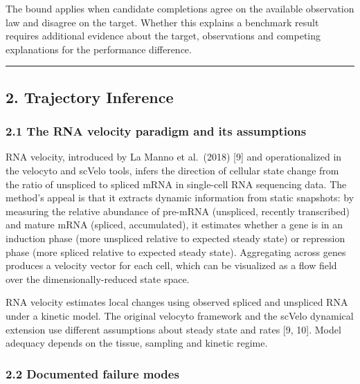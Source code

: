 \documentclass[
]{article}
\begin{document}
The bound applies when candidate completions agree on the available
observation law and disagree on the target. Whether this explains a
benchmark result requires additional evidence about the target,
observations and competing explanations for the performance difference.

\begin{center}\rule{0.5\linewidth}{0.5pt}\end{center}

\hypertarget{trajectory-inference}{%
\subsection{2. Trajectory Inference}\label{trajectory-inference}}

\hypertarget{the-rna-velocity-paradigm-and-its-assumptions}{%
\subsubsection{2.1 The RNA velocity paradigm and its
assumptions}\label{the-rna-velocity-paradigm-and-its-assumptions}}

RNA velocity, introduced by La Manno et al.~(2018) {[}9{]} and
operationalized in the velocyto and scVelo tools, infers the direction
of cellular state change from the ratio of unspliced to spliced mRNA in
single-cell RNA sequencing data. The method's appeal is that it extracts
dynamic information from static snapshots: by measuring the relative
abundance of pre-mRNA (unspliced, recently transcribed) and mature mRNA
(spliced, accumulated), it estimates whether a gene is in an induction
phase (more unspliced relative to expected steady state) or repression
phase (more spliced relative to expected steady state). Aggregating
across genes produces a velocity vector for each cell, which can be
visualized as a flow field over the dimensionally-reduced state space.

RNA velocity estimates local changes using observed spliced and
unspliced RNA under a kinetic model. The original velocyto framework and
the scVelo dynamical extension use different assumptions about steady
state and rates {[}9, 10{]}. Model adequacy depends on the tissue,
sampling and kinetic regime.

\hypertarget{documented-failure-modes}{%
\subsubsection{2.2 Documented failure
modes}\label{documented-failure-modes}}
\end{document}
